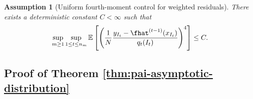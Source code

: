 \documentclass[11pt]{article}
\newtheorem{assumption}[theorem]{Assumption}
\begin{document}
\begin{assumption}[Uniform fourth-moment control for weighted residuals]
\label{a3:4th-moment-control}
    There exists a deterministic constant $C < \infty$ such that
    \begin{align*}
        \sup_{m \geq 1} \sup_{1 \leq t \leq n_m} \mathbb{E}\left[ \left( \frac{1}{N} \frac{y_{I_t} - \fhat^{(t-1)}(x_{I_t})}{q_t(I_t)} \right)^4 \right] \leq C.
    \end{align*}
\end{assumption}

\subsection{Proof of Theorem \ref{thm:pai-asymptotic-distribution}}
\label{proof:pai-thm}
\end{document}
